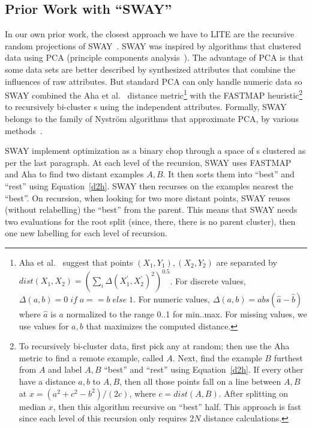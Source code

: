 \subsection{Prior Work with ``SWAY''}\label{sway}
In our own prior work, the closest approach we have to LITE are  the   recursive random projections of SWAY~\cite{Chen19}. 
SWAY was inspired by   algorithms that clustered data using  PCA (principle components analysis~\cite{pearson1901principal}).
The advantage of PCA is that some data sets are better described by synthesized attributes that combine the influences of raw attributes.
But standard PCA can only handle numeric data so SWAY combined the Aha et al.~\cite{aha91} distance metric\footnote{ Aha et al.~\cite{aha91}  suggest that points $(X_1,Y_1), (X_2,Y_2)$ are
separated by $\mathit{dist}(X_1,X_2)= \left(\sum_i \Delta(X_1^{'},X_2^{'})^2\right)^{0.5}$. For discrete values, 
\mbox{$\Delta(a,b)=0\;\mathit{if}\;a==b\;\mathit{else}
\;1$}.
For numeric values,
$\Delta(a,b) = 
\mathit{abs}(\hat{a} - \hat{b})$ where $\hat{a}$ is $a$   normalized to the range 0..1 for min..max.
For missing values, we use values for 
$a,b$ that maximizes the computed distance.
}
with the FASTMAP heuristic\footnote{To 
  recursively bi-cluster data, first pick any {\eg}  at random; 
  then use the Aha metric to find a remote  example, called $A$.
  Next, find the  example $B$ furthest from $A$ and label $A,B$ ``best'' and ``rest'' using   Equation~\ref{d2h}.
If every other {\eg} have a distance $a,b$ to $A,B$, then all those points fall on a line between $A,B$ at $x=(a^2+c^2-b^2)/(2c)$, where  $c=\mathit{dist}(A,B)$.
After splitting on median $x$, then this algorithm recursive on ``best'' half. 
This approach is fast since each level of this recursion only requires $2N$ distance calculations.}~\cite{faloutsos1995fastmap} to recursively bi-cluster {\eg}s using the independent attributes. Formally, SWAY belongs to the family of Nystr\"om algorithms that approximate PCA, by various methods~\cite{platt2005fastmap}.
 
  SWAY  
   implement optimization as a binary chop through a space of {\eg}s
   clustered as per the last paragraph.
 At each level of the recursion, SWAY uses FASTMAP and Aha to find two distant examples $A,B$. It then sorts them into ``best'' and ``rest'' using Equation~\ref{d2h}.  SWAY then recurses on the examples nearest the ``best''.  
 On recursion, when looking for two more distant points, SWAY 
 reuses (without relabelling) the  ``best'' {\eg} from the  parent. This means that SWAY needs two evaluations for the root split (since, there,  there is no parent cluster), then one new labelling for each level of recursion.


